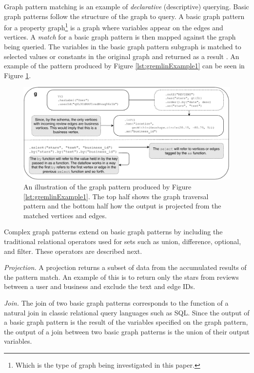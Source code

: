 Graph pattern matching is an example of \emph{declarative} (descriptive) querying. Basic graph patterns follow the structure of the graph to query. A basic graph pattern for a property graph\footnote{Which is the type of graph being investigated in this paper.} is a graph where variables appear on the edges and vertices. A \emph{match} for a basic graph pattern is then mapped against the graph being queried. The variables in the basic graph pattern subgraph is matched to selected values or constants in the original graph and returned as a result \cite{foundationsOfModernGql}. An example of the pattern produced by Figure \ref{lst:gremlinExample1} can be seen in Figure \ref{fig:gremlinPattern}.

\begin{figure}[h]
    \centering
    \includegraphics[width=14cm]{img/4_glangFigures/gremlinPattern.pdf}
    \caption{An illustration of the graph pattern produced by Figure \ref{lst:gremlinExample1}. The top half shows the graph traversal pattern and the bottom half how the output is projected from the matched vertices and edges.}
    \label{fig:gremlinPattern}
\end{figure}

Complex graph patterns extend on basic graph patterns by including the traditional relational operators used for sets such as union, difference, optional, and filter. These operators are described next.

\textit{Projection. }
A projection returns a subset of data from the accumulated results of the pattern match. An example of this is to return only the stars from reviews between a user and business and exclude the text and edge IDs.

\textit{Join. }
The join of two basic graph patterns corresponds to the function of a natural join in classic relational query languages such as SQL. Since the output of a basic graph pattern is the result of the variables specified on the graph pattern, the output of a join between two basic graph patterns is the union of their output variables.

